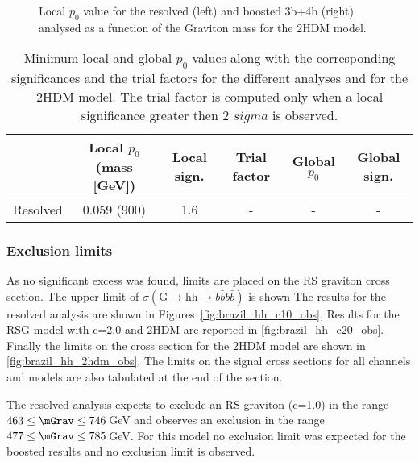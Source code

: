 \clearpage

\begin{figure}[ht!]
\begin{center}
\caption{Local $p_0$ value for the resolved (left) and boosted 3b+4b (right) analysed as a function of the Graviton mass for the 2HDM model.}
\label{fig:p0_2HDM}
\end{center}
\end{figure}



\begin{table}[ht!]
\begin{center}
\begin{tabular}{l|c|c|c|c|c}
                  & Local $p_0$ (mass [GeV]) & Local sign. & Trial factor & Global $p_0$ & Global sign. \\ 
  \hline
  \hline
Resolved          & 0.059 (900)     & 1.6         & -         & -        & - \\  
  \hline
\end{tabular}
\caption{Minimum local and global $p_0$ values along with the corresponding significances
  and the trial factors for the different analyses and for the 2HDM model.
  The trial factor is computed only when a local
significance greater then 2 $sigma$ is observed.}
\label{tab:p0_2HDM}
\end{center}
\end{table}

\clearpage



\subsubsection{Exclusion limits}

As no significant excess was found, limits are placed on the RS graviton cross section.
The upper limit of $\sigma(\mathrm{G} \to{\mathrm{hh}}\to b\bar{b}b\bar{b})$ is shown 
The results for the resolved analysis are shown
in Figures~\ref{fig:brazil_hh_c10_obs},
Results for the RSG model with c=2.0 and 2HDM are reported in
 \ref{fig:brazil_hh_c20_obs}.
Finally the limits on the cross section for the 2HDM model are shown in
 \ref{fig:brazil_hh_2hdm_obs}.
The limits on the signal cross sections for all channels and models
are also tabulated at the end of the section.

The resolved analysis expects to exclude an RS graviton (c=1.0) in the range $463\leq\mGrav\leq 746$\,GeV
and observes an exclusion in the range $477\leq\mGrav\leq 785$\,GeV.
For this model no exclusion limit was expected for the boosted results and no exclusion limit
is observed.

